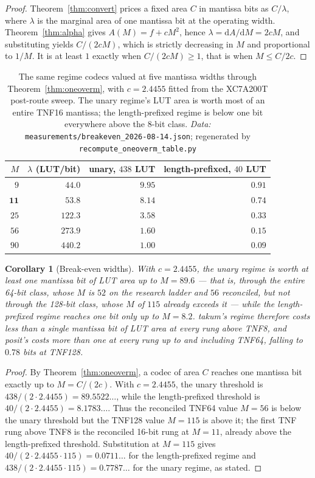 \documentclass[11pt]{article}
\newtheorem{corollary}{Corollary}
\theoremstyle{definition}
\begin{document}
\begin{proof}
Theorem~\ref{thm:convert} prices a fixed area $C$ in mantissa bits as $C/\lambda$,
where $\lambda$ is the marginal area of one mantissa bit at the operating width.
Theorem~\ref{thm:alpha} gives $A(M) = f + cM^{2}$, hence
$\lambda = \mathrm{d}A/\mathrm{d}M = 2cM$, and substituting yields $C/(2cM)$, which
is strictly decreasing in $M$ and proportional to $1/M$. It is at least $1$ exactly
when $C/(2cM) \ge 1$, that is when $M \le C/2c$.
\end{proof}

\begin{table}[t]\centering
\caption{The same regime codecs valued at five mantissa widths through
Theorem~\ref{thm:oneoverm}, with $c = 2.4455$ fitted from the XC7A200T post-route sweep. The unary
regime's LUT area is worth most of an entire TNF16 mantissa; the length-prefixed
regime is below one bit everywhere above the 8-bit class. \emph{Data:} \texttt{measurements/breakeven\_2026-08-14.json}; regenerated by \texttt{recompute\_oneoverm\_table.py}}
\label{tab:oneoverm}
\begin{tabular}{rrrr}
\toprule
$M$ & $\lambda$ (LUT/bit) & unary, $438$ LUT & length-prefixed, $40$ LUT \\
\midrule
$9$  & $44.0$  & $9.95$ & $0.91$ \\
$\mathbf{11}$ & $\mathbf{53.8}$  & $\mathbf{8.14}$ & $\mathbf{0.74}$ \\
$25$ & $122.3$ & $3.58$ & $0.33$ \\
$56$ & $273.9$ & $1.60$ & $0.15$ \\
$90$ & $440.2$ & $1.00$ & $0.09$ \\
\bottomrule
\end{tabular}
\end{table}

\begin{corollary}[Break-even widths]
\label{cor:breakeven}
With $c = 2.4455$, the unary regime is worth at least one mantissa bit of LUT area
up to $M = 89.6$ --- that is, through the entire 64-bit class, whose $M$ is $52$ on
the research ladder and $56$ reconciled, but not through the 128-bit class, whose
$M$ of $115$ already exceeds it --- while the length-prefixed regime reaches one
bit only up to $M = 8.2$. takum's regime therefore costs less than a single
mantissa bit of LUT area at every rung above TNF8, and posit's costs more than one
at every rung up to and including TNF64, falling to $0.78$ bits at TNF128.
\end{corollary}
\begin{proof}
By Theorem~\ref{thm:oneoverm}, a codec of area $C$ reaches one mantissa bit
exactly up to $M=C/(2c)$. With $c=2.4455$, the unary threshold is
$438/(2\cdot2.4455)=89.5522\ldots$, while the length-prefixed threshold is
$40/(2\cdot2.4455)=8.1783\ldots$. Thus the reconciled TNF64 value $M=56$ is
below the unary threshold but the TNF128 value $M=115$ is above it; the first
TNF rung above TNF8 is the reconciled 16-bit rung at $M=11$, already above
the length-prefixed threshold.
Substitution at $M=115$ gives $40/(2\cdot2.4455\cdot115)=0.0711\ldots$ for
the length-prefixed regime and $438/(2\cdot2.4455\cdot115)=0.7787\ldots$ for
the unary regime, as stated.
\end{proof}
\end{document}
